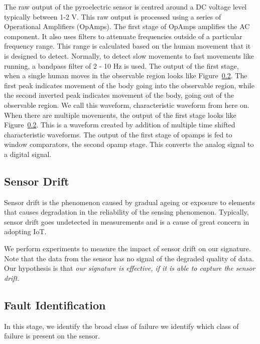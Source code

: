 The raw output of the pyroelectric sensor is centred around a DC voltage level typically between 1-2 V. This raw output is processed using a series of Operational Amplifiers (OpAmps). The first stage of OpAmps amplifies the AC component. It also uses filters to attenuate frequencies outside of a particular frequency range. This range is calculated based on the human movement that it is designed to detect. Normally, to detect slow movements to fast movements like running, a bandpass filter of 2 - 10 Hz is used. The output of the first stage, when a single human moves in the observable region looks like Figure~\ref{}. The first peak indicates movement of the body going into the observable region, while the second inverted peak indicates movement of the body, going out of the observable region. We call this waveform, characteristic waveform from here on. When there are multiple movements, the output of the first stage looks like Figure~\ref{}. This is a waveform created by addition of multiple time shifted characteristic waveforms.
The output of the first stage of opamps is fed to window comparators, the second opamp stage. This converts the analog signal to a digital signal. 

\subsection{Sensor Drift} Sensor drift is the phenomenon caused by gradual ageing or exposure to elements that causes degradation in the reliability of the sensing phenomenon. Typically, sensor drift goes undetected in measurements and is a cause of great concern in adopting IoT.

We perform experiments to measure the impact of sensor drift on our signature. Note that the data from the sensor has no signal of the degraded quality of data. Our hypothesis is that \textit{our signature is effective, if it is able to capture the sensor drift.}





\subsection{Fault Identification} In this stage, we identify the broad class of failure \ie we identify which class of failure is present on the sensor. 

